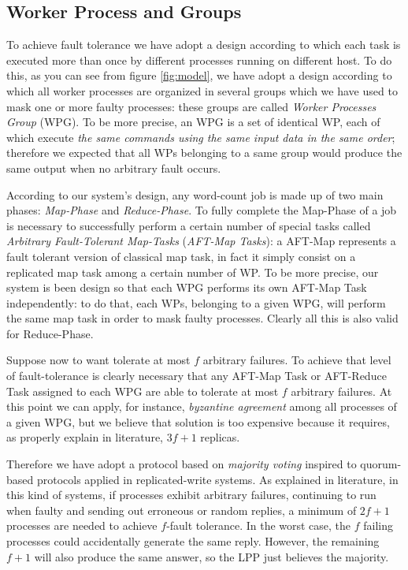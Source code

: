 \documentclass[sigchi]{acmart}
\begin{document}
\subsection{Worker Process and Groups}

To achieve fault tolerance we have adopt a design according to which each task is executed more than once by different processes running on different host. To do this, as you can see from figure \ref{fig:model}, we have adopt a design according to which all worker processes are organized in several groups which we have used to mask one or more faulty processes: these groups are called \textit{Worker Processes Group} (WPG). To be more precise, an WPG is a set of identical WP, each of which execute \textit{the same commands using the same input data in the same order}; therefore we expected that all WPs belonging to a same group would produce the same output when no arbitrary fault occurs. 

According to our system's design, any word-count job is made up of two main phases: \textit{Map-Phase} and \textit{Reduce-Phase}. To fully complete the Map-Phase of a job is necessary to successfully perform a certain number of special tasks called \textit{Arbitrary Fault-Tolerant Map-Tasks} (\textit{AFT-Map Tasks}): a AFT-Map represents a fault tolerant version of classical map task, in fact it simply consist on a replicated map task among a certain number of WP. To be more precise, our system is been design so that each WPG performs its own AFT-Map Task independently: to do that, each WPs, belonging to a given WPG, will perform the same map task in order to mask faulty processes. Clearly all this is also valid for Reduce-Phase.

Suppose now to want tolerate at most $f$ arbitrary failures. To achieve that level of fault-tolerance is clearly necessary that any AFT-Map Task or AFT-Reduce Task assigned to each WPG are able to tolerate at most $f$ arbitrary failures. At this point we can apply, for instance, \textit{byzantine agreement} among all processes of a given WPG, but we believe that solution is too expensive because it requires, as properly explain in literature\citep{SDCC}, $3f + 1$ replicas.

Therefore we have adopt a protocol based on \textit{majority voting} inspired to quorum-based protocols applied in replicated-write systems. As explained in literature\citep{SDCC}, in this kind of systems, if processes exhibit arbitrary failures, continuing to run when faulty and sending out erroneous or random replies, a minimum of $2f+1$ processes are needed to achieve $f$-fault tolerance. In the worst case, the $f$ failing processes could accidentally generate the same reply. However, the remaining $f+1$ will also produce the same answer, so the LPP just believes the majority.
\end{document}
